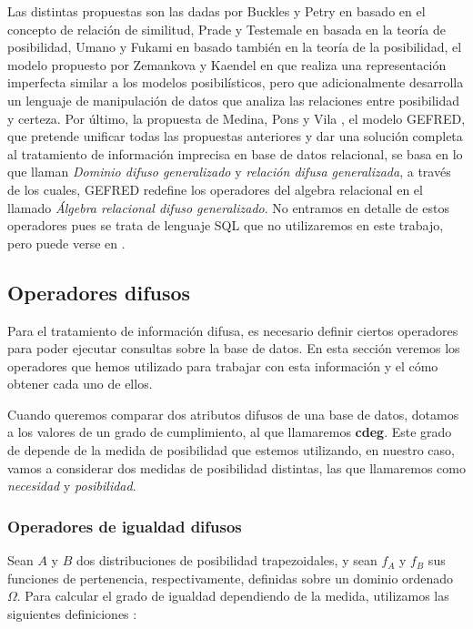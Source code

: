 Las distintas propuestas son las dadas por Buckles y Petry en \cite{buckles, buckles2, buckles3} basado en el concepto de relación de similitud, Prade y Testemale en \cite{prade, prade2, prade3, prade4} basada en la teoría de posibilidad, Umano y Fukami en \cite{fukami, fukami2, fukami3, fukami4} basado también en la teoría de la posibilidad, el modelo propuesto por Zemankova y Kaendel en \cite{zemankova, zemankova2} que realiza una representación imperfecta similar a los modelos posibilísticos, pero que adicionalmente desarrolla un lenguaje de manipulación de datos que analiza las relaciones entre posibilidad y certeza. Por último, la propuesta de Medina, Pons y Vila \cite{gefred}, el modelo GEFRED, que pretende unificar todas las propuestas anteriores y dar una solución completa al tratamiento de información imprecisa en base de datos relacional, se basa en lo que llaman \textit{Dominio difuso generalizado} y \textit{relación difusa generalizada}, a través de los cuales, GEFRED redefine los operadores del algebra relacional en el llamado \textit{Álgebra relacional difuso generalizado}. No entramos en detalle de estos operadores pues se trata de lenguaje SQL que no utilizaremos en este trabajo, pero puede verse en \cite{gefred}.

\subsection{Operadores difusos}

Para el tratamiento de información difusa, es necesario definir ciertos operadores para poder ejecutar consultas sobre la base de datos. En esta sección veremos los operadores que hemos utilizado para trabajar con esta información y el cómo obtener cada uno de ellos.

Cuando queremos comparar dos atributos difusos de una base de datos, dotamos a los valores de un grado de cumplimiento, al que llamaremos \textbf{cdeg}. Este grado de depende de la medida de posibilidad que estemos utilizando, en nuestro caso, vamos a considerar dos medidas de posibilidad distintas, las que llamaremos como \textit{necesidad} y \textit{posibilidad}.

\subsubsection{Operadores de igualdad difusos}

Sean $A$ y $B$ dos distribuciones de posibilidad trapezoidales, y sean $f_A$ y $f_B$ sus funciones de pertenencia, respectivamente, definidas sobre un dominio ordenado $\Omega$. Para calcular el grado de igualdad dependiendo de la medida, utilizamos las siguientes definiciones \cite{tesispepe}:

